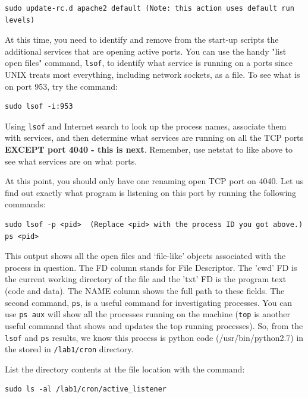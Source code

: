 \documentclass{article}
\begin{document}
\begin{verbatim}
sudo update-rc.d apache2 default (Note: this action uses default run levels)
\end{verbatim}

At this time, you need to identify and remove from the start-up scripts the additional services that are opening active ports. You can use the handy "list open files" command, {\tt lsof}, to identify what service is running on a ports since UNIX treats most everything, including network sockets, as a file. To see what is on port 953, try the command:
\begin{verbatim}
sudo lsof -i:953
\end{verbatim}


Using {\tt lsof} and Internet search to look up the process names, associate them with services, and then determine what services are running on all the TCP ports \textbf{EXCEPT port 4040 - this is next}. Remember, use netstat to like above to see what services are on what ports. \medskip


At this point, you should only have one renaming open TCP port on 4040. Let us find out exactly what program is listening on this port by running the following commands:
\begin{verbatim}
sudo lsof -p <pid>  (Replace <pid> with the process ID you got above.)
ps <pid>
\end{verbatim}
This output shows all the open files and ‘file-like’ objects associated with the process in question. The FD column stands for File Descriptor. The 'cwd' FD is the current working directory of the file and the 'txt' FD is the program text (code and data). The NAME column shows the full path to these fields. The second command, {\tt ps}, is a useful command for investigating processes. You can use {\tt ps aux} will show all the processes running on the machine ({\tt top} is another useful command that shows and updates the top running processes). So, from the {\tt lsof} and {\tt ps} results, we know this process is python code (/usr/bin/python2.7) in the stored in {\tt /lab1/cron} directory.\medskip

List the directory contents at the file location with the command:
\begin{verbatim}
sudo ls -al /lab1/cron/active_listener 
\end{verbatim}
\end{document}
